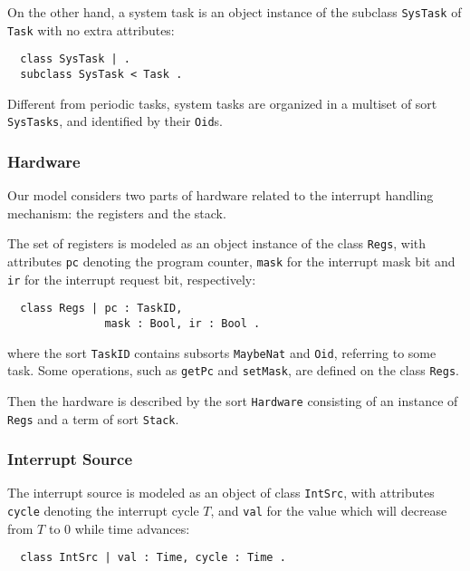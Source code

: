 \documentclass[10pt,journal]{IEEEtran}
\newcommand{\hide}[1]{\ignorespaces}
\begin{document}
{On the other hand, a system task is an object instance of the subclass
\verb|SysTask| of \verb|Task| with no extra attributes:
\begin{verbatim}
  class SysTask | .  
  subclass SysTask < Task .
\end{verbatim}
Different from periodic tasks, system tasks are organized in a
multiset of sort \verb|SysTasks|, and identified by their \verb|Oid|s.

\subsubsection{Hardware}
Our model considers two parts of hardware related to the interrupt
handling mechanism: the registers and the stack.

The set of registers is modeled as an object instance of the class
\verb|Regs|, with attributes \verb|pc| denoting the program counter,
\verb|mask| for the interrupt mask bit and \verb|ir| for the interrupt
request bit, respectively:
\begin{verbatim}
  class Regs | pc : TaskID, 
               mask : Bool, ir : Bool .
\end{verbatim}
where the sort \verb|TaskID| contains subsorts \verb|MaybeNat| and
\verb|Oid|, referring to some task.
\hide{
\begin{verbatim}
  subsorts MaybeNat Oid < TaskID .
\end{verbatim}
}
Some operations, such as \verb|getPc| and \verb|setMask|, are defined
on the class \verb|Regs|.

Then the hardware is described by the sort \verb|Hardware| consisting
of an instance of \verb|Regs| and a term of sort \verb|Stack|.  
\hide{
\begin{verbatim}
  op [_;_] : Object Stack ~> Hardware [ctor] .
  mb ([ < O:Oid : Regs |> ; S:Stack ]) 
       : Hardware .
\end{verbatim}
}

\subsubsection{Interrupt Source}
The interrupt source is modeled as an object of class \verb|IntSrc|,
with attributes \verb|cycle| denoting the interrupt cycle $T$, and
\verb|val| for the value which will decrease from $T$ to $0$ while
time advances:
\begin{verbatim}
  class IntSrc | val : Time, cycle : Time .
\end{verbatim}

}
\end{document}
